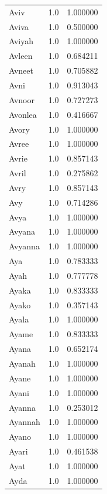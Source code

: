 \documentclass[
  letterpaper,
  DIV=11,
  numbers=noendperiod]{scrreprt}
\begin{document}
\begin{tabular}{lrr}
Aviv            &   1.0 &   1.000000 \\
Aviva           &   1.0 &   0.500000 \\
Aviyah          &   1.0 &   1.000000 \\
Avleen          &   1.0 &   0.684211 \\
Avneet          &   1.0 &   0.705882 \\
Avni            &   1.0 &   0.913043 \\
Avnoor          &   1.0 &   0.727273 \\
Avonlea         &   1.0 &   0.416667 \\
Avory           &   1.0 &   1.000000 \\
Avree           &   1.0 &   1.000000 \\
Avrie           &   1.0 &   0.857143 \\
Avril           &   1.0 &   0.275862 \\
Avry            &   1.0 &   0.857143 \\
Avy             &   1.0 &   0.714286 \\
Avya            &   1.0 &   1.000000 \\
Avyana          &   1.0 &   1.000000 \\
Avyanna         &   1.0 &   1.000000 \\
Aya             &   1.0 &   0.783333 \\
Ayah            &   1.0 &   0.777778 \\
Ayaka           &   1.0 &   0.833333 \\
Ayako           &   1.0 &   0.357143 \\
Ayala           &   1.0 &   1.000000 \\
Ayame           &   1.0 &   0.833333 \\
Ayana           &   1.0 &   0.652174 \\
Ayanah          &   1.0 &   1.000000 \\
Ayane           &   1.0 &   1.000000 \\
Ayani           &   1.0 &   1.000000 \\
Ayanna          &   1.0 &   0.253012 \\
Ayannah         &   1.0 &   1.000000 \\
Ayano           &   1.0 &   1.000000 \\
Ayari           &   1.0 &   0.461538 \\
Ayat            &   1.0 &   1.000000 \\
Ayda            &   1.0 &   1.000000 \\

\end{tabular}
\end{document}
